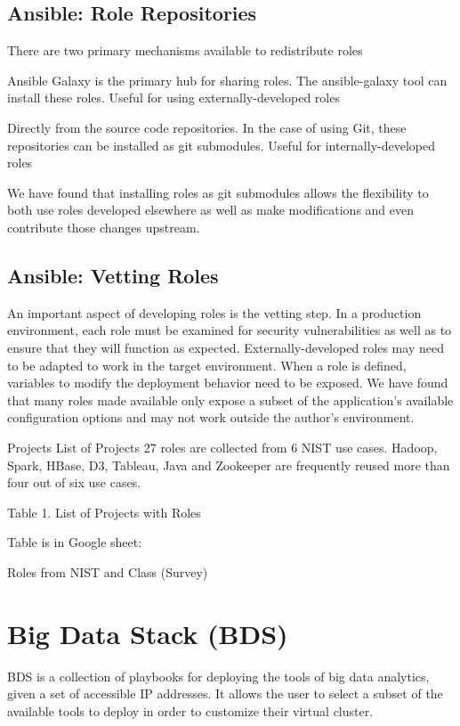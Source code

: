 \subsection{Ansible: Role Repositories}

There are two primary mechanisms available to redistribute roles

Ansible Galaxy is the primary hub for sharing roles. The
ansible-galaxy tool can install these roles. Useful for using
externally-developed roles

Directly from the source code repositories. In the case of using Git,
these repositories can be installed as git submodules. Useful for
internally-developed roles

We have found that installing roles as git submodules allows the
flexibility to both use roles developed elsewhere as well as make
modifications and even contribute those changes upstream.

\subsection{Ansible: Vetting Roles}
An important aspect of developing roles is the vetting step. In a
production environment, each role must be examined for security
vulnerabilities as well as to ensure that they will function as
expected. Externally-developed roles may need to be adapted to work in
the target environment. When a role is defined, variables to modify
the deployment behavior need to be exposed. We have found that many
roles made available only expose a subset of the application's
available configuration options and may not work outside the author's
environment.

Projects
List of Projects
27 roles are collected from 6 NIST use cases. Hadoop, Spark, HBase,
D3, Tableau, Java and Zookeeper are frequently reused more than four
out of six use cases.

Table 1. List of Projects with Roles

Table is in Google sheet: 

Roles from NIST and Class (Survey)


\section{Big Data Stack (BDS)}

BDS is a collection of playbooks for deploying the tools of big data analytics, given a set of accessible IP addresses. It allows the user to select a subset of the available tools to deploy in order to customize their virtual cluster.

